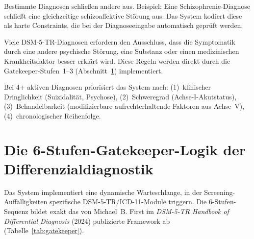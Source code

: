 \documentclass[11pt,a4paper]{article}
\begin{document}
\begin{description}[style=nextline, leftmargin=1.5cm, font=\bfseries]
\item[Hierarchische Exklusionsregeln] Bestimmte Diagnosen schlie\ss{}en andere aus. Beispiel: Eine Schizophrenie-Diagnose schlie\ss{}t eine gleichzeitige schizoaffektive St\"orung aus. Das System kodiert diese als harte Constraints, die bei der Diagnoseeingabe automatisch gepr\"uft werden.
\item[\glqq Due to another condition\grqq{}-Regeln] Viele DSM-5-TR-Diagnosen erfordern den Ausschluss, dass die Symptomatik durch eine andere psychische St\"orung, eine Substanz oder einen medizinischen Krankheitsfaktor besser erkl\"art wird. Diese Regeln werden direkt durch die Gatekeeper-Stufen~1--3 (Abschnitt~\ref{sec:gatekeeper}) implementiert.
\item[Erlaubte Komorbidit\"aten mit Priorisierung] Bei 4+ aktiven Diagnosen priorisiert das System nach: (1)~klinischer Dringlichkeit (Suizidalit\"at, Psychose), (2)~Schweregrad (Achse-I-Akutstatus), (3)~Behandelbarkeit (modifizierbare aufrechterhaltende Faktoren aus Achse~V), (4)~chronologischer Reihenfolge.
\end{description}


\section{Die 6-Stufen-Gatekeeper-Logik der Differenzialdiagnostik}
\label{sec:gatekeeper}

Das System implementiert eine dynamische Warteschlange, in der Screening-Auff\"alligkeiten spezifische DSM-5-TR/ICD-11-Module triggern. Die 6-Stufen-Sequenz bildet exakt das von Michael~B. First im \textit{DSM-5-TR Handbook of Differential Diagnosis} (2024) publizierte Framework ab (Tabelle~\ref{tab:gatekeeper}).
\end{document}
